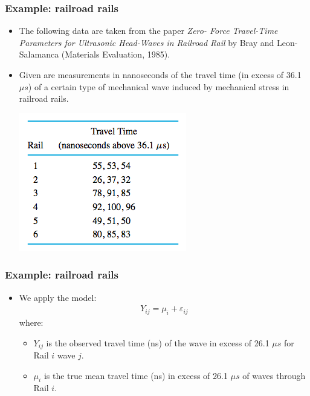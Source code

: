 \documentclass[handout]{beamer}\usepackage[]{graphicx}\usepackage[]{color}
\providecommand{\e}{\varepsilon}
\numberwithin{equation}{section}
\begin{document}
\begin{frame}
\frametitle{Example: railroad rails} \small
\begin{itemize}
\item The following data are taken from the paper \emph{Zero- Force Travel-Time Parameters for Ultrasonic Head-Waves in Railroad Rail} by Bray and Leon- Salamanca (Materials Evaluation, 1985).
\pause \item Given are measurements in nanoseconds of the travel time (in excess of 36.1 $\mu s$) of a certain type of mechanical wave induced by mechanical stress in railroad rails. 
\begin{center}
 \includegraphics{../../fig/railsdat.png}
\end{center}
\end{itemize}
\end{frame}

\begin{frame}
\frametitle{Example: railroad rails}
\begin{itemize}
\item We apply the model:
\pause \begin{align*}
Y_{ij} = \mu_{i} + \e_{ij}
\end{align*}
where:
\begin{itemize}
\pause \item $Y_{ij}$ is the observed travel time (ns) of the wave in excess of 26.1 $\mu s$ for Rail $i$ wave $j$.
\pause \item $\mu_i$ is the true mean travel time (ns) in excess of 26.1 $\mu s$ of waves through Rail $i$.
\end{itemize}
\end{itemize}
\end{frame}
\end{document}
